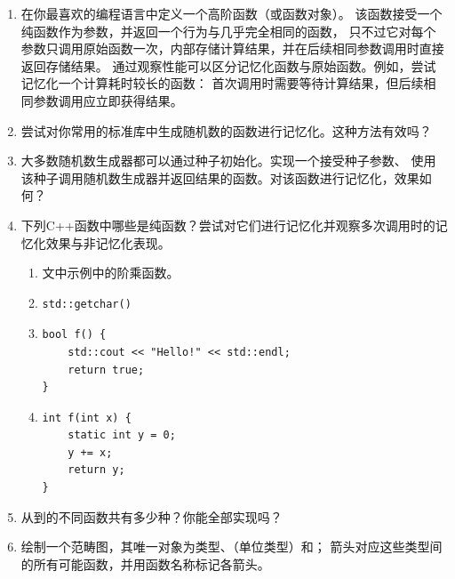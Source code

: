 \begin{enumerate}
  \tightlist
  \item
        在你最喜欢的编程语言中定义一个高阶函数（或函数对象）。
        该函数接受一个纯函数作为参数，并返回一个行为与几乎完全相同的函数，
        只不过它对每个参数只调用原始函数一次，内部存储计算结果，并在后续相同参数调用时直接返回存储结果。
        通过观察性能可以区分记忆化函数与原始函数。例如，尝试记忆化一个计算耗时较长的函数：
        首次调用时需要等待计算结果，但后续相同参数调用应立即获得结果。
  \item
        尝试对你常用的标准库中生成随机数的函数进行记忆化。这种方法有效吗？
  \item
        大多数随机数生成器都可以通过种子初始化。实现一个接受种子参数、
        使用该种子调用随机数生成器并返回结果的函数。对该函数进行记忆化，效果如何？
  \item
        下列C++函数中哪些是纯函数？尝试对它们进行记忆化并观察多次调用时的记忆化效果与非记忆化表现。

        \begin{enumerate}
          \tightlist
          \item
                文中示例中的阶乘函数。
          \item
                \begin{verbatim}
std::getchar()
\end{verbatim}
          \item
                \begin{verbatim}
bool f() {
    std::cout << "Hello!" << std::endl;
    return true;
}
\end{verbatim}
          \item
                \begin{verbatim}
int f(int x) {
    static int y = 0;
    y += x;
    return y;
}
\end{verbatim}
        \end{enumerate}
  \item
        从到的不同函数共有多少种？你能全部实现吗？
  \item
        绘制一个范畴图，其唯一对象为类型、\code{()}（单位类型）和；
        箭头对应这些类型间的所有可能函数，并用函数名称标记各箭头。
\end{enumerate}
